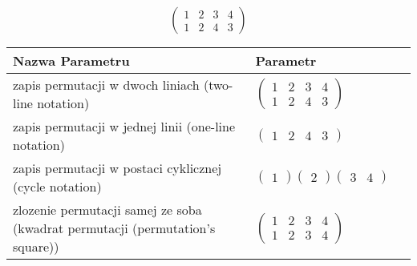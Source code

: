\documentclass[12pt]{article}
\begin{document}
\subsection{}
\begin{center}
\[
\begin{pmatrix}
	1 & 2 & 3 & 4 \\ 
	1 & 2 & 4 & 3 
\end{pmatrix}
\]

\begin{tabular}{|m{0.6\linewidth}|m{0.4\linewidth}|}
	\hline
	Nazwa Parametru & Parametr \\
	\hline
	zapis permutacji w dwoch liniach (two-line notation) & $\begin{pmatrix} 1 & 2 & 3 & 4 \\ 
1 & 2 & 4 & 3 \end{pmatrix}$ \\ 
	\hline
	zapis permutacji w jednej linii (one-line notation) & $\begin{pmatrix} 1 & 2 & 4 & 3 \end{pmatrix}$ \\ 
	\hline
	zapis permutacji w postaci cyklicznej (cycle notation) & $\begin{pmatrix} 1 \end{pmatrix} \begin{pmatrix} 2 \end{pmatrix} \begin{pmatrix} 3 & 4 \end{pmatrix} $ \\ 
	\hline
	zlozenie permutacji samej ze soba (kwadrat permutacji (permutation's square)) & $\begin{pmatrix} 1 & 2 & 3 & 4 \\ 
1 & 2 & 3 & 4 \end{pmatrix}$ \\ 
	\hline
\end{tabular}
\end{center}
\end{document}
